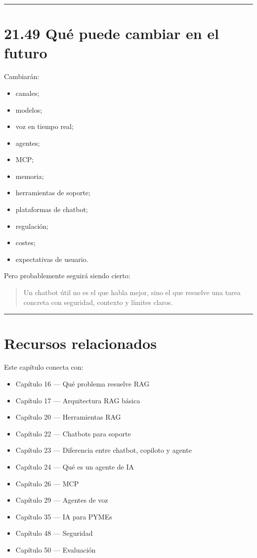\begin{center}\rule{0.5\linewidth}{0.5pt}\end{center}

\section{21.49 Qué puede cambiar en el
futuro}\label{quuxe9-puede-cambiar-en-el-futuro-20}

Cambiarán:

\begin{itemize}
\tightlist
\item
  canales;
\item
  modelos;
\item
  voz en tiempo real;
\item
  agentes;
\item
  MCP;
\item
  memoria;
\item
  herramientas de soporte;
\item
  plataformas de chatbot;
\item
  regulación;
\item
  costes;
\item
  expectativas de usuario.
\end{itemize}

Pero probablemente seguirá siendo cierto:

\begin{quote}
Un chatbot útil no es el que habla mejor, sino el que resuelve una tarea
concreta con seguridad, contexto y límites claros.
\end{quote}

\begin{center}\rule{0.5\linewidth}{0.5pt}\end{center}

\section{Recursos relacionados}\label{recursos-relacionados-20}

Este capítulo conecta con:

\begin{itemize}
\tightlist
\item
  Capítulo 16 --- Qué problema resuelve RAG
\item
  Capítulo 17 --- Arquitectura RAG básica
\item
  Capítulo 20 --- Herramientas RAG
\item
  Capítulo 22 --- Chatbots para soporte
\item
  Capítulo 23 --- Diferencia entre chatbot, copiloto y agente
\item
  Capítulo 24 --- Qué es un agente de IA
\item
  Capítulo 26 --- MCP
\item
  Capítulo 29 --- Agentes de voz
\item
  Capítulo 35 --- IA para PYMEs
\item
  Capítulo 48 --- Seguridad
\item
  Capítulo 50 --- Evaluación
\end{itemize}

